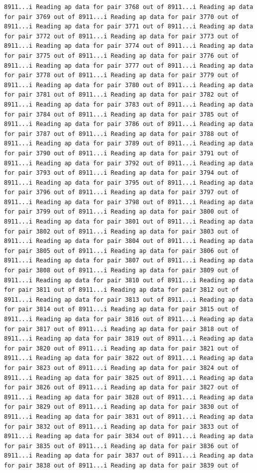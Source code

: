 \documentclass[
]{article}
\begin{document}
\begin{verbatim}
8911...i Reading ap data for pair 3768 out of 8911...i Reading ap data for pair 3769 out of 8911...i Reading ap data for pair 3770 out of 8911...i Reading ap data for pair 3771 out of 8911...i Reading ap data for pair 3772 out of 8911...i Reading ap data for pair 3773 out of 8911...i Reading ap data for pair 3774 out of 8911...i Reading ap data for pair 3775 out of 8911...i Reading ap data for pair 3776 out of 8911...i Reading ap data for pair 3777 out of 8911...i Reading ap data for pair 3778 out of 8911...i Reading ap data for pair 3779 out of 8911...i Reading ap data for pair 3780 out of 8911...i Reading ap data for pair 3781 out of 8911...i Reading ap data for pair 3782 out of 8911...i Reading ap data for pair 3783 out of 8911...i Reading ap data for pair 3784 out of 8911...i Reading ap data for pair 3785 out of 8911...i Reading ap data for pair 3786 out of 8911...i Reading ap data for pair 3787 out of 8911...i Reading ap data for pair 3788 out of 8911...i Reading ap data for pair 3789 out of 8911...i Reading ap data for pair 3790 out of 8911...i Reading ap data for pair 3791 out of 8911...i Reading ap data for pair 3792 out of 8911...i Reading ap data for pair 3793 out of 8911...i Reading ap data for pair 3794 out of 8911...i Reading ap data for pair 3795 out of 8911...i Reading ap data for pair 3796 out of 8911...i Reading ap data for pair 3797 out of 8911...i Reading ap data for pair 3798 out of 8911...i Reading ap data for pair 3799 out of 8911...i Reading ap data for pair 3800 out of 8911...i Reading ap data for pair 3801 out of 8911...i Reading ap data for pair 3802 out of 8911...i Reading ap data for pair 3803 out of 8911...i Reading ap data for pair 3804 out of 8911...i Reading ap data for pair 3805 out of 8911...i Reading ap data for pair 3806 out of 8911...i Reading ap data for pair 3807 out of 8911...i Reading ap data for pair 3808 out of 8911...i Reading ap data for pair 3809 out of 8911...i Reading ap data for pair 3810 out of 8911...i Reading ap data for pair 3811 out of 8911...i Reading ap data for pair 3812 out of 8911...i Reading ap data for pair 3813 out of 8911...i Reading ap data for pair 3814 out of 8911...i Reading ap data for pair 3815 out of 8911...i Reading ap data for pair 3816 out of 8911...i Reading ap data for pair 3817 out of 8911...i Reading ap data for pair 3818 out of 8911...i Reading ap data for pair 3819 out of 8911...i Reading ap data for pair 3820 out of 8911...i Reading ap data for pair 3821 out of 8911...i Reading ap data for pair 3822 out of 8911...i Reading ap data for pair 3823 out of 8911...i Reading ap data for pair 3824 out of 8911...i Reading ap data for pair 3825 out of 8911...i Reading ap data for pair 3826 out of 8911...i Reading ap data for pair 3827 out of 8911...i Reading ap data for pair 3828 out of 8911...i Reading ap data for pair 3829 out of 8911...i Reading ap data for pair 3830 out of 8911...i Reading ap data for pair 3831 out of 8911...i Reading ap data for pair 3832 out of 8911...i Reading ap data for pair 3833 out of 8911...i Reading ap data for pair 3834 out of 8911...i Reading ap data for pair 3835 out of 8911...i Reading ap data for pair 3836 out of 8911...i Reading ap data for pair 3837 out of 8911...i Reading ap data for pair 3838 out of 8911...i Reading ap data for pair 3839 out of 
\end{verbatim}
\end{document}
